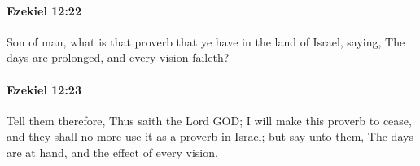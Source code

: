 		\paragraph{Ezekiel 12:22} %
			\label{EZEKIEL-12-22}

			Son of man, what is that proverb that ye have in the land of Israel, saying, The days are prolonged, and every vision faileth?


		\paragraph{Ezekiel 12:23} %
			\label{EZEKIEL-12-23}

			Tell them therefore, Thus saith the Lord GOD; I will make this proverb to cease, and they shall no more use it as a proverb in Israel; but say unto them, The days are at hand, and the effect of every vision.



